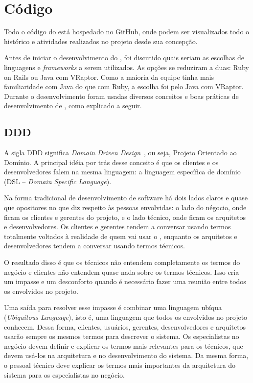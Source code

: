 \section{Código}

Todo o código do \calopsita{} está hospedado no GitHub, onde podem ser visualizados todo o histórico e atividades realizados no projeto desde sua concepção.

Antes de iniciar o desenvolvimento do \calopsita{}, foi discutido quais seriam as escolhas de linguagens e \textit{frameworks} a serem utilizados. As opções se reduziram a duas: Ruby on Rails ou Java com VRaptor. Como a maioria da equipe tinha mais familiaridade com Java do que com Ruby, a escolha foi pelo Java com VRaptor. Durante o desenvolvimento foram usadas diversos conceitos e boas práticas de desenvolvimento de \software{}, como explicado a seguir.


\subsection{DDD}

A sigla DDD significa \textit{Domain Driven Design}~\cite{ddd}, ou seja, Projeto Orientado ao Domínio. A principal idéia por trás desse conceito é que os clientes e os desenvolvedores falem na mesma linguagem: a linguagem específica de domínio (DSL -- \textit{Domain Specific Language}).

Na forma tradicional de desenvolvimento de software há dois lados claros e quase que opositores no que diz respeito às pessoas envolvidas: o lado do négocio, onde ficam os clientes e gerentes do projeto, e o lado técnico, onde ficam os arquitetos e desenvolvedores. Os clientes e gerentes tendem a conversar usando termos totalmente voltados à realidade de quem vai usar o \software{}, enquanto os arquitetos e desenvolvedores tendem a conversar usando termos técnicos. 

O resultado disso é que os técnicos não entendem completamente os termos do negócio e clientes não entendem quase nada sobre os termos técnicos. Isso cria um impasse e um desconforto quando é necessário fazer uma reunião entre todos os envolvidos no projeto.

Uma saída para resolver esse impasse é combinar uma linguagem ubíqua (\textit{Ubiquitous Language}), isto é, uma linguagem que todos os envolvidos no projeto conhecem. Dessa forma, clientes, usuários, gerentes, desenvolvedores e arquitetos usarão sempre os mesmos termos para descrever o sistema. Os especialistas no negócio devem definir e explicar os termos mais relevantes para os técnicos, que devem usá-los na arquitetura e no desenvolvimento do sistema. Da mesma forma, o pessoal técnico deve explicar os termos mais importantes da arquitetura do sistema para os especialistas no negócio.

